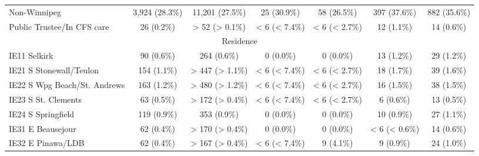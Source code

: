 \documentclass{article}
\begin{document}
\begin{table}[htbp]
\begin{longtable}{l*{6}{c}}
  Non-Winnipeg                                          &          3,924 (28.3\%)         &         11,201 (27.5\%)         &           25 (30.9\%)           &           58 (26.5\%)           &           397 (37.6\%)          &           882 (35.6\%)          \\
  Public Trustee/In CFS care                            &            26 (0.2\%)           &          > 52 (> 0.1\%)         &          < 6 (< 7.4\%)          &          < 6 (< 2.7\%)          &            12 (1.1\%)           &            14 (0.6\%)           \\
\multicolumn{7}{c}{Residence                                               }\\
  IE11 Selkirk                                          &            90 (0.6\%)           &           264 (0.6\%)           &            0 (0.0\%)            &            0 (0.0\%)            &            13 (1.2\%)           &            29 (1.2\%)           \\
  IE21 S Stonewall/Teulon                               &           154 (1.1\%)           &         > 447 (> 1.1\%)         &          < 6 (< 7.4\%)          &          < 6 (< 2.7\%)          &            18 (1.7\%)           &            39 (1.6\%)           \\
  IE22 S Wpg Beach/St. Andrews                          &           163 (1.2\%)           &         > 480 (> 1.2\%)         &          < 6 (< 7.4\%)          &          < 6 (< 2.7\%)          &            16 (1.5\%)           &            38 (1.5\%)           \\
  IE23 S St. Clements                                   &            63 (0.5\%)           &         > 172 (> 0.4\%)         &          < 6 (< 7.4\%)          &          < 6 (< 2.7\%)          &            6 (0.6\%)            &            13 (0.5\%)           \\
  IE24 S Springfield                                    &           119 (0.9\%)           &           353 (0.9\%)           &            0 (0.0\%)            &            0 (0.0\%)            &            10 (0.9\%)           &            27 (1.1\%)           \\
  IE31 E Beausejour                                     &            62 (0.4\%)           &         > 170 (> 0.4\%)         &            0 (0.0\%)            &            0 (0.0\%)            &          < 6 (< 0.6\%)          &            14 (0.6\%)           \\
  IE32 E Pinawa/LDB                                     &            62 (0.4\%)           &         > 167 (> 0.4\%)         &          < 6 (< 7.4\%)          &            9 (4.1\%)            &            9 (0.9\%)            &            24 (1.0\%)           \\

\end{longtable}
\end{table}
\end{document}
